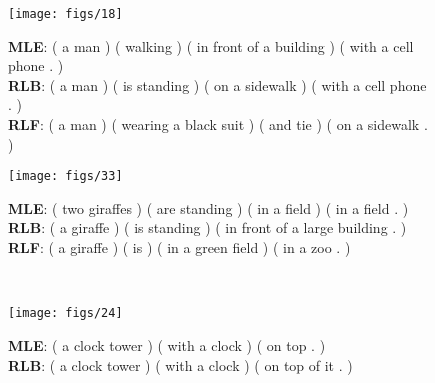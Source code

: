 \begin{figure}[t!]
\vspace{-1mm}
\scriptsize
    \begin{minipage}{.13\textwidth}
      \vspace{3mm}
      \texttt{[image: figs/18]}
      \vspace{1mm}
    \end{minipage}
    \hspace{1mm}
    \begin{minipage}{.33\textwidth}
      {\bf MLE}: ( a man ) ( walking ) ( in front of a building ) ( with a cell phone . )\\
       {\bf RLB}: ( a man ) ( is standing ) ( on a sidewalk ) ( with a cell phone . )\\
        {\bf RLF}: ( a man ) ( wearing a black suit ) ( and tie ) ( on a sidewalk . )\\
        \end{minipage}
        \hspace{4mm}
              \begin{minipage}{.13\textwidth}
      \vspace{3mm}
      \texttt{[image: figs/33]}
      \vspace{1mm}
    \end{minipage}
    \hspace{1mm}
    \begin{minipage}{.33\textwidth}
        {\bf MLE}: ( two giraffes ) ( are standing ) ( in a field ) ( in a field . )\\
        {\bf RLB}: ( a giraffe ) ( is standing ) ( in front of a large building . )\\
        {\bf RLF}: ( a giraffe ) ( is ) ( in a green field ) ( in a zoo . )\\
         \end{minipage}\\[-5mm]
             \begin{minipage}{.13\textwidth}
      \vspace{3mm}
      \texttt{[image: figs/24]}
      \vspace{1mm}
    \end{minipage}
    \hspace{1mm}
    \begin{minipage}{.33\textwidth}
      {\bf MLE}: ( a clock tower ) ( with a clock ) ( on top . )\\
       {\bf RLB}:  ( a clock tower ) ( with a clock ) ( on top of it . )\\

\end{minipage}
\end{figure}
